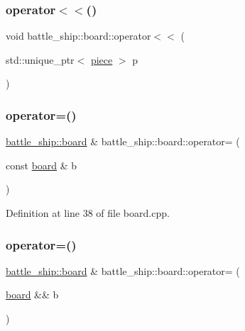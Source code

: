 \subsubsection{\texorpdfstring{operator$<$$<$()}{operator<<()}}
{\footnotesize\ttfamily void battle\+\_\+ship\+::board\+::operator$<$$<$ (\begin{DoxyParamCaption}\item[{std\+::unique\+\_\+ptr$<$ \hyperlink{classbattle__ship_1_1piece}{piece} $>$}]{p }\end{DoxyParamCaption})}

\mbox{\label{classbattle__ship_1_1board_a4349c045147f686d09cdc47690f15e34}} 
\subsubsection{\texorpdfstring{operator=()}{operator=()}\hspace{0.1cm}{\footnotesize\ttfamily [1/2]}}
{\footnotesize\ttfamily \hyperlink{classbattle__ship_1_1board}{battle\+\_\+ship\+::board} \& battle\+\_\+ship\+::board\+::operator= (\begin{DoxyParamCaption}\item[{const \hyperlink{classbattle__ship_1_1board}{board} \&}]{b }\end{DoxyParamCaption})}



Definition at line 38 of file board.\+cpp.

\mbox{\label{classbattle__ship_1_1board_ae6dc011dea24157e59e2b3a6f34af586}} 
\subsubsection{\texorpdfstring{operator=()}{operator=()}\hspace{0.1cm}{\footnotesize\ttfamily [2/2]}}
{\footnotesize\ttfamily \hyperlink{classbattle__ship_1_1board}{battle\+\_\+ship\+::board} \& battle\+\_\+ship\+::board\+::operator= (\begin{DoxyParamCaption}\item[{\hyperlink{classbattle__ship_1_1board}{board} \&\&}]{b }\end{DoxyParamCaption})}



